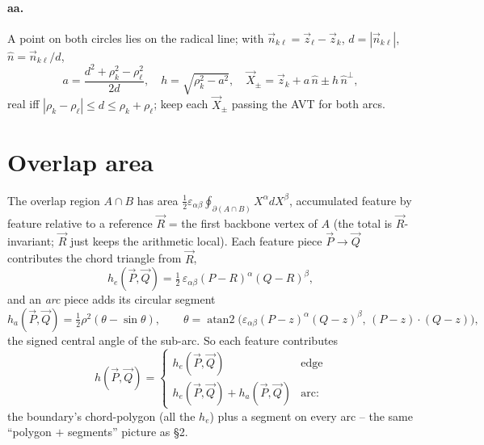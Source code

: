 \documentclass[11pt]{article}
\numberwithin{equation}{section}
\newcommand{\vv}[1]{\vec{#1}}
\newcommand{\half}{\tfrac{1}{2}}
\DeclareMathOperator{\atantwo}{atan2}
\begin{document}
\paragraph{aa.} A point on both circles lies on the radical line; with $\vv n_{k\ell}=\vv z_\ell-\vv
z_k$, $d=|\vv n_{k\ell}|$, $\hat n=\vv n_{k\ell}/d$,
\begin{equation}
  a=\frac{d^2+\rho_k^2-\rho_\ell^2}{2d},\quad h=\sqrt{\rho_k^2-a^2},\quad
  \vv X_{\pm}=\vv z_k+a\,\hat n\pm h\,\hat n^{\perp},
\end{equation}
real iff $|\rho_k-\rho_\ell|\le d\le\rho_k+\rho_\ell$; keep each $\vv X_{\pm}$ passing the AVT for
both arcs.

\section{Overlap area}

The overlap region $A\cap B$ has area $\half\varepsilon_{\alpha\beta}\oint_{\partial(A\cap
B)}X^{\alpha}dX^{\beta}$, accumulated feature by feature relative to a reference $\vv R$ = the first
backbone vertex of $A$ (the total is $\vv R$-invariant; $\vv R$ just keeps the arithmetic local).
Each feature piece $\vv P\to\vv Q$ contributes the chord triangle from $\vv R$,
\begin{equation}
  h_e(\vv P,\vv Q)=\half\,\varepsilon_{\alpha\beta}(P-R)^{\alpha}(Q-R)^{\beta},
\end{equation}
and an \emph{arc} piece adds its circular segment
\begin{equation}
  h_a(\vv P,\vv Q)=\half\rho^2(\theta-\sin\theta),\qquad
  \theta=\atantwo\big(\varepsilon_{\alpha\beta}(P-z)^{\alpha}(Q-z)^{\beta},\,(P-z)\!\cdot\!(Q-z)\big),
\end{equation}
the signed central angle of the sub-arc. So each feature contributes
\begin{equation}
  h(\vv P,\vv Q)=\begin{cases}h_e(\vv P,\vv Q) & \text{edge}\\ h_e(\vv P,\vv Q)+h_a(\vv P,\vv Q) & \text{arc:}\end{cases}
\end{equation}
the boundary's chord-polygon (all the $h_e$) plus a segment on every arc -- the same ``polygon $+$
segments'' picture as \S2.
\end{document}
